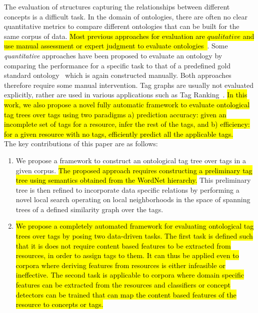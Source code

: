 {%

The evaluation of structures capturing the relationships between different concepts is a difficult task. In the domain of ontologies, there are often no clear quantitative metrics to compare different ontologies that can be built for the same corpus of data. \hl{Most previous approaches for evaluation are $qualitative$ and use manual assessment or expert judgment to evaluate ontologies~{\cite{buitelaar2005ontology}}{\cite{feiliang2012demo}}{\cite{ren2012cheap}}}. Some {\em quantitative} approaches have been proposed to evaluate an ontology by comparing the performance for a specific task to that of a predefined gold standard ontology~\cite{porzel2004task} which is again constructed manually. Both approaches therefore require some manual intervention. Tag graphs are usually not evaluated explicitly, rather are used in various applications such as Tag Ranking~\cite{liu2009tag}. \hl{In this work, we also propose a novel fully automatic framework to evaluate ontological tag trees over tags using two paradigms a) prediction accuracy: given an incomplete set of tags for a resource, infer the rest of the tags, and b) efficiency: for a given resource with no tags, efficiently predict all the applicable tags. } \\
\indent The key contributions of this paper are as follows:
\begin{enumerate}
	\item We propose a framework to construct an ontological tag tree over tags in a given corpus. \hl{The proposed approach requires constructing a preliminary tag tree using semantics obtained from the WordNet hierarchy.} This preliminary tree is then refined to incorporate data specific relations by performing a novel local search operating on local neighborhoods in the space of spanning trees of a defined similarity graph over the tags. 
	\item \hl{We propose a completely automated framework for evaluating ontological tag trees over tags by posing two data-driven tasks. The first task is defined such that it is does not require content based features to be extracted from resources, in order to assign tags to them. It can thus be applied even to corpora where deriving features from resources is either infeasible or ineffective. The second task is applicable to corpora where domain specific features can be extracted from the resources and classifiers or concept detectors can be trained that can map the content based features of the resource to concepts or tags. 
}
\end{enumerate}}
